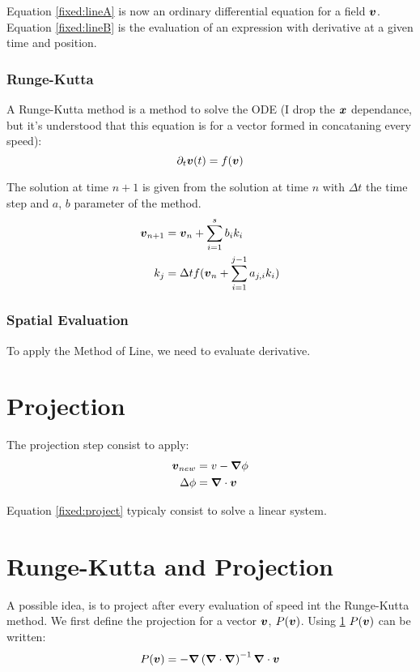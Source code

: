 Equation \ref{fixed:lineA} is now an ordinary differential equation for a field ${\boldsymbol {v}}$.
Equation \ref{fixed:lineB} is the evaluation of an expression with derivative at a given time and position.

\subsubsection{Runge-Kutta}

A Runge-Kutta method is a method to solve the ODE (I drop the ${\boldsymbol {x}}$ dependance, but it's understood that this equation is for a vector formed in concataning every speed):
\begin{equation}
 \partial_t {\boldsymbol {v}}(t)=f({\boldsymbol {v}})
\end{equation}

The solution at time $n+1$ is given from the solution at time $n$ with $\Delta t$ the time step and $a$, $b$ parameter of the method.
\begin{align*}
	{\boldsymbol {v}}_{n+1}&={\boldsymbol {v}}_{n}+\sum_{i=1}^{s}b_{i}k_{i}\\
	k_{j}&=\Delta t f({\boldsymbol {v}}_{n}+\sum_{i=1}^{j-1}a_{j,i}k_{i})
\end{align*}

\subsubsection{Spatial Evaluation}
To apply the Method of Line, we need to evaluate derivative.

\section{Projection}
\label{fixed:projection}
The projection step consist to apply:
 \begin{align}
  {\boldsymbol {v}}_{new}&=v-{\boldsymbol {\nabla}}\phi\\
  \Delta \phi&={\boldsymbol {\nabla}} \cdot {\boldsymbol {v}}\label{fixed:project}
 \end{align}

 Equation \ref{fixed:project} typicaly consist to solve a linear system.
 
 \section{Runge-Kutta and Projection}
 
 A possible idea, is to project after every evaluation of speed int the Runge-Kutta method.
 We first define the projection for a vector ${\boldsymbol {v}}$, $P({\boldsymbol {v}})$.
 Using \ref{fixed:projection} $P({\boldsymbol {v}})$ can be written:
 \begin{equation}
  P({\boldsymbol {v}})=-{\boldsymbol {\nabla}}\left({\boldsymbol {\nabla}}\cdot {\boldsymbol {\nabla}}\right)^{-1}{\boldsymbol {\nabla}}\cdot{\boldsymbol {v}}
 \end{equation}


